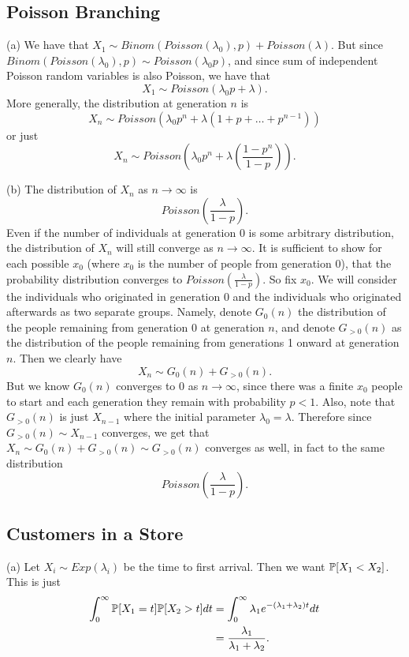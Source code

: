 \subsection{Poisson Branching}

(a) We have that $X_1 \sim Binom(Poisson(\lambda_0), p) + Poisson(\lambda)$. But since $Binom(Poisson(\lambda_0), p) \sim Poisson(\lambda_0 p)$, and since sum of independent Poisson random variables is also Poisson, we have that 
\[
X_1 \sim Poisson(\lambda_0 p + \lambda).
\]
More generally, the distribution at generation $n$ is 
\[
X_n \sim Poisson(\lambda_0 p^n + \lambda(1 + p + \dots + p^{n - 1}))
\]
or just
\[
X_n \sim Poisson\left(\lambda_0 p^n + \lambda\left(\frac{1 - p^n}{1 - p}\right)\right).
\]

(b) The distribution of $X_n$ as $n \to \infty$ is
\[
Poisson\left(\frac{\lambda}{1 - p}\right).
\]
Even if the number of individuals at generation 0 is some arbitrary distribution, the distribution of $X_n$ will still converge as $n \to \infty$. It is sufficient to show for each possible $x_0$ (where $x_0$ is the number of people from generation 0), that the probability distribution converges to $Poisson\left(\frac{\lambda}{1 - p}\right)$. So fix $x_0$. We will consider the individuals who originated in generation 0 and the individuals who originated afterwards as two separate groups. Namely, denote $G_0(n)$ the distribution of the people remaining from generation 0 at generation $n$, and denote $G_{>0}(n)$ as the distribution of the people remaining from generations 1 onward at generation $n$. Then we clearly have
\[
X_n \sim G_0(n) + G_{>0}(n).
\]
But we know $G_0(n)$ converges to 0 as $n \to \infty$, since there was a finite $x_0$ people to start and each generation they remain with probability $p < 1$. Also, note that $G_{>0}(n)$ is just $X_{n - 1}$ where the initial parameter $\lambda_0 = \lambda$. Therefore since $G_{>0}(n) \sim X_{n - 1}$ converges, we get that $X_n \sim G_0(n) + G_{>0}(n) \sim G_{>0}(n)$ converges as well, in fact to the same distribution
\[
Poisson\left(\frac{\lambda}{1 - p}\right).
\]


\subsection{Customers in a Store}

(a) Let $X_i \sim Exp(\lambda_i)$ be the time to first arrival. Then we want $\P[X_1 < X_2]$. This is just
\begin{align*}
    \int_0^\infty\P[X_1 = t]\P[X_2 > t]dt &= \int_0^\infty\lambda_1e^{-(\lambda_1 + \lambda_2)t}dt \\
    &= \frac{\lambda_1}{\lambda_1 + \lambda_2}.
\end{align*}

